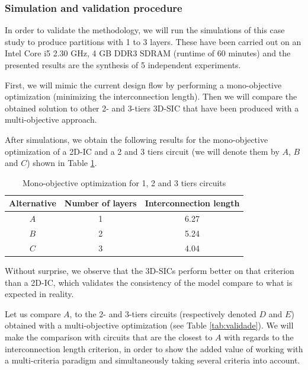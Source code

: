 \subsubsection{Simulation and validation procedure}
In order to validate the methodology, we will run the simulations of this case study to produce partitions with 1 to 3 layers. These have been carried out on an Intel Core i5 2.30 GHz, 4 GB DDR3 SDRAM (runtime of 60 minutes) and the presented results are the synthesis of 5 independent experiments.

First, we will mimic the current design flow by performing a mono-objective optimization (minimizing the interconnection length). Then we will compare the obtained solution to other 2- and 3-tiers 3D-SIC that have been produced with a multi-objective approach.

After simulations, we obtain the following results for the mono-objective optimization of a 2D-IC and a 2 and 3 tiers circuit (we will denote them by $A$, $B$ and $C$) shown in Table \ref{tab:validabc}.

\begin{table}[h!]
\caption{Mono-objective optimization for 1, 2 and 3 tiers circuits}
\begin{center}
\begin{small}
\begin{tabular}{|c|c|c|}
\hline
Alternative & Number of layers & Interconnection length\\
\hline
$A$ & 1 & 6.27\\
$B$ & 2 & 5.24\\
$C$ & 3 & 4.04\\
\hline
\end{tabular}
\end{small}
\end{center}
\label{tab:validabc}
\end{table}

Without surprise, we observe that the 3D-SICs perform better on that criterion than a 2D-IC, which validates the consistency of the model compare to what is expected in reality.

Let us compare $A$, to the 2- and 3-tiers circuits (respectively denoted $D$ and $E$) obtained with a multi-objective optimization (see Table \ref{tab:validade}). We will make the comparison with circuits that are the closest to $A$ with regards to the interconnection length criterion, in order to show the added value of working with a multi-criteria paradigm and simultaneously taking several criteria into account.

